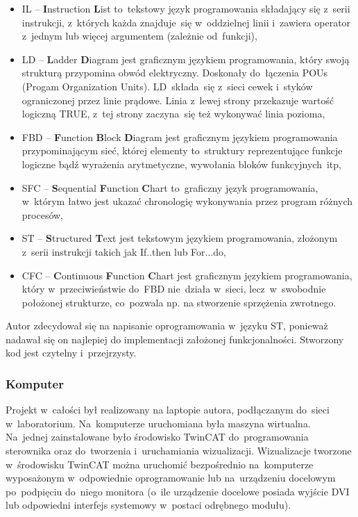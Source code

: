 \begin{itemize}
\item IL -- \textbf{I}nstruction \textbf{L}ist to~tekstowy język programowania składający się z~serii instrukcji, z~których każda znajduje~się w~oddzielnej linii i~zawiera operator z~jednym lub więcej argumentem (zależnie od~funkcji),

\item LD -- \textbf{L}adder \textbf{D}iagram jest graficznym językiem programowania, który swoją strukturą przypomina obwód elektryczny. Doskonały do~łączenia POUs (Progam Organization Units). LD~składa~się z~sieci cewek i~styków ograniczonej przez linie prądowe. Linia z~lewej strony przekazuje wartość logiczną TRUE, z~tej strony zaczyna~się też wykonywać linia pozioma,

\item FBD -- \textbf{F}unction \textbf{B}lock \textbf{D}iagram jest graficznym językiem programowania przypominającym sieć, której elementy to~struktury reprezentujące funkcje logiczne bądź wyrażenia arytmetyczne, wywołania bloków funkcyjnych~itp,

\item SFC -- \textbf{S}equential \textbf{F}unction \textbf{C}hart to~graficzny język programowania, w~którym łatwo jest ukazać chronologię wykonywania przez program różnych procesów,

\item ST -- \textbf{S}tructured \textbf{T}ext jest tekstowym językiem programowania, złożonym z~serii instrukcji takich jak If..then lub For...do,

\item CFC -- \textbf{C}ontinuous \textbf{F}unction \textbf{C}hart jest graficznym językiem programowania, który w~przeciwieństwie do~FBD nie~działa w~sieci, lecz~w~swobodnie położonej strukturze, co~pozwala np. na stworzenie sprzężenia zwrotnego.
\end{itemize}

\noindent Autor zdecydował się na napisanie oprogramowania w~języku ST, ponieważ nadawał się on najlepiej do implementacji założonej funkcjonalności. Stworzony kod jest czytelny i~przejrzysty.

\subsubsection{Komputer}
Projekt w~całości był realizowany na laptopie autora, podłączanym do~sieci w~laboratorium. Na~komputerze uruchomiana była maszyna wirtualna. Na~jednej zainstalowane było środowisko TwinCAT do~programowania sterownika oraz do~tworzenia i~uruchamiania wizualizacji. Wizualizacje tworzone w~środowisku TwinCAT można uruchomić bezpośrednio na~komputerze wyposażonym w~odpowiednie oprogramowanie lub na~urządzeniu docelowym po~podpięciu do~niego monitora (o~ile urządzenie docelowe posiada wyjście DVI lub odpowiedni interfejs systemowy w~postaci odrębnego modułu).

